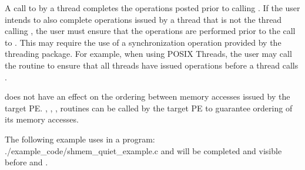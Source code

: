 \begin{apidefinition}
{    A call to  by a thread completes the operations posted
    prior to calling . If the user intends to also complete
    operations issued by a thread that is not the thread calling
    , the user must ensure that the operations are performed
    prior to the call to . This may require the use of a
    synchronization operation provided by the threading package. For example,
    when using POSIX Threads, the user may call the
     routine to ensure that all threads have issued
    operations before a thread calls .

     does not have an effect on the ordering between memory
    accesses issued by the target \ac{PE}. ,
    , ,  routines
    can be called by the target \ac{PE} to guarantee ordering of its memory accesses.
}

\begin{apiexamples}

\apicexample
    {The following example uses  in a \Cstd[11] program: }
    {./example_code/shmem_quiet_example.c}
    { and  will be completed and visible before 
    and .}
\end{apiexamples}

\end{apidefinition}
